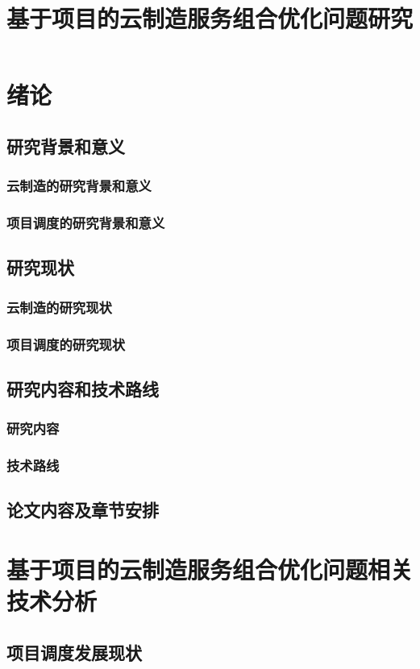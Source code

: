 \documentclass[UTF8]{ctexart}
\title{基于项目的云制造服务组合优化问题研究}
\date{}
\begin{document}
\maketitle
\section{绪论}
	\subsection{研究背景和意义}
		\subsubsection{云制造的研究背景和意义}
		\subsubsection{项目调度的研究背景和意义}
	\subsection{研究现状}
		\subsubsection{云制造的研究现状}
		\subsubsection{项目调度的研究现状}
	\subsection{研究内容和技术路线}
		\subsubsection{研究内容}
		\subsubsection{技术路线}
	\subsection{论文内容及章节安排}

\section{基于项目的云制造服务组合优化问题相关技术分析}
	\subsection{项目调度发展现状}
\end{document}

